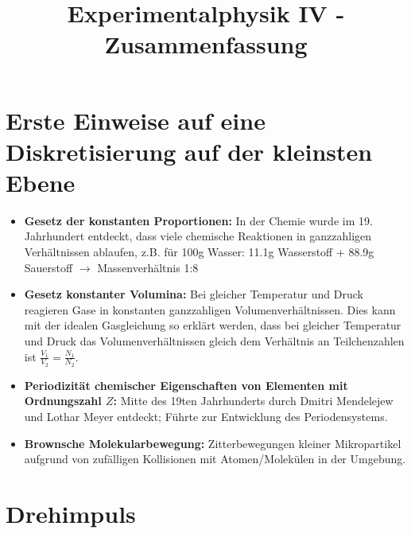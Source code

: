 \documentclass[twocolumn]{summery_4.1}
\title{Experimentalphysik IV - Zusammenfassung}
\begin{document}
\maketitle
\tableofcontents

\section{Erste Einweise auf eine Diskretisierung auf der kleinsten Ebene}
\begin{itemize}
    \item \textbf{Gesetz der konstanten Proportionen:} In der Chemie wurde im 19. Jahrhundert entdeckt, dass viele chemische Reaktionen in ganzzahligen Verhältnissen ablaufen, z.B. für 100g Wasser: 11.1g Wasserstoff + 88.9g Sauerstoff $\to$ Massenverhältnis 1:8 
    \item \textbf{Gesetz konstanter Volumina:} Bei gleicher Temperatur und Druck reagieren Gase in konstanten ganzzahligen Volumenverhältnissen. Dies kann mit der idealen Gasgleichung so erklärt werden, dass bei gleicher Temperatur und Druck das  Volumenverhältnissen gleich dem Verhältnis an Teilchenzahlen ist $\frac{V_1}{V_2} = \frac{N_1}{N_2}$.
    \item\textbf{Periodizität chemischer Eigenschaften von Elementen mit Ordnungszahl $Z$:} Mitte des 19ten Jahrhunderts durch Dmitri Mendelejew und Lothar
    Meyer entdeckt; Führte zur Entwicklung des Periodensystems.
    \item\textbf{Brownsche Molekularbewegung:} Zitterbewegungen kleiner Mikropartikel aufgrund von zufälligen Kollisionen mit Atomen/Molekülen in der Umgebung.
\end{itemize}

\onecolumn
\section{Drehimpuls}
\end{document}
